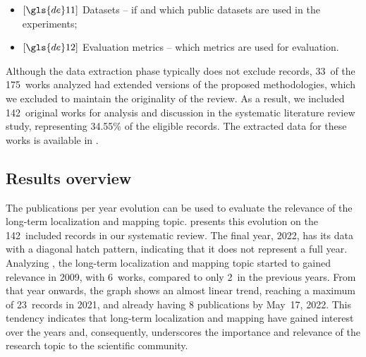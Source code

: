 \begin{itemize}
to the non-public experiments if available, as follows:
  \begin{itemize}
  \item total distance (km) of the non-public experiments;
  \item path (km), in the case of repetitive paths;
  \item total time (h) in terms of continuous operation;
  \item time interval (day/week/month/year, or d/w/m/y) between the first and
  the last run.
  \end{itemize}
\item $\left[\gls{de}11\right]$ Datasets -- if and which public datasets are
used in the experiments;
\item $\left[\gls{de}12\right]$ Evaluation metrics -- which metrics are used
for evaluation.
\end{itemize}

Although the data extraction phase typically does not exclude records,
33~of the 175~works analyzed had extended versions of the proposed
methodologies, which we excluded to maintain the originality of the review.
As a result, we included 142~original works for analysis and discussion
in the systematic literature review study,
representing 34.55\% of the eligible records.
The extracted data for these works is available in .

\subsection{Results overview}\label{sec:literature:systematic:results}

The publications per year evolution can be used to evaluate the
relevance of the long-term localization and mapping topic.
 presents this evolution on
the 142~included records in our systematic review.
The final year, 2022, has its data with a diagonal hatch pattern,
indicating that it does not represent a full year.
Analyzing ,
the long-term localization and mapping topic started to gained relevance in
2009, with 6~works, compared to only 2~in the previous years.
From that year onwards, the graph shows an almost linear trend,
reaching a maximum of 23~records in 2021,
and already having 8 publications by May~17, 2022.
This tendency indicates that long-term localization and mapping
have gained interest over the years and, consequently,
underscores the importance and relevance of the research topic
to the scientific community.

